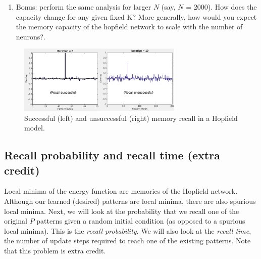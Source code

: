 \documentclass[letterpaper,11pt]{article}
\begin{document}
\begin{enumerate}
  \item Bonus: perform the same analysis for larger $N$ (say, $N$ = 2000). How does the capacity
change for any given fixed K? More generally, how would you expect the memory capacity
of the hopfield network to scale with the number of neurons?.
\end{enumerate}

\begin{figure}[h!]
  \begin{center}
    \includegraphics[width=0.7\textwidth]{recall.png}
    \caption{Successful (left) and unsuccessful (right) memory recall in a Hopfield model.}
    \label{fig:recall}
  \end{center}
\end{figure}

\subsection{Recall probability and recall time (extra credit)}
Local minima of the energy function are memories of the Hopfield network.
Although our learned (desired) patterns are local minima, there are also spurious local minima.
Next, we will look at the probability that we recall one of the original $P$ patterns given a random initial condition (as opposed to a spurious local minima).
This is the \textit{recall probability}.
We will also look at the \textit{recall time}, the number of update steps required to reach one of the existing patterns.
Note that this problem is extra credit.
\end{document}
